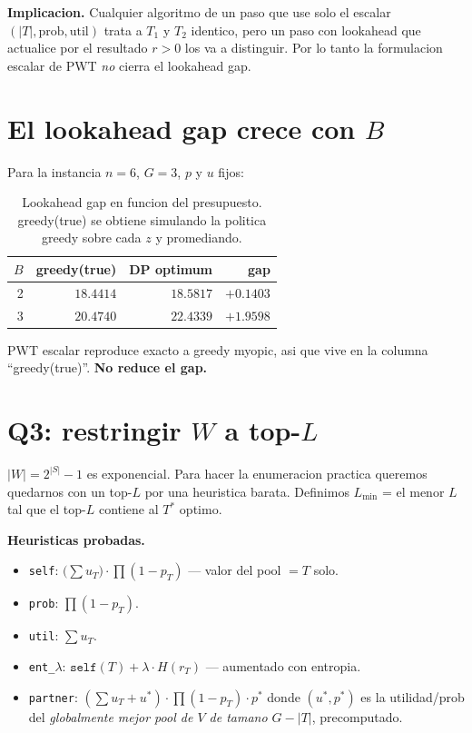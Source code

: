 \documentclass[11pt]{article}
\begin{document}
\textbf{Implicacion.} Cualquier algoritmo de un paso que use solo el
escalar $(|T|, \text{prob}, \text{util})$ trata a $T_1$ y $T_2$
identico, pero un paso con lookahead que actualice por el resultado
$r > 0$ los va a distinguir. Por lo tanto la formulacion escalar de
PWT \emph{no} cierra el lookahead gap.

\section{El lookahead gap crece con $B$}

Para la instancia $n=6$, $G=3$, $p$ y $u$ fijos:

\begin{table}[h]
\centering
\begin{tabular}{rrrr}
\toprule
$B$ & greedy(true) & DP optimum & gap \\
\midrule
2 & $18.4414$ & $18.5817$ & $+0.1403$ \\
3 & $20.4740$ & $22.4339$ & $+1.9598$ \\
\bottomrule
\end{tabular}
\caption{Lookahead gap en funcion del presupuesto. greedy(true) se
obtiene simulando la politica greedy sobre cada $z$ y promediando.}
\end{table}

PWT escalar reproduce exacto a greedy myopic, asi que vive en la
columna ``greedy(true)''. \textbf{No reduce el gap.}

\section{Q3: restringir $W$ a top-$L$}

$|W| = 2^{|S|} - 1$ es exponencial. Para hacer la enumeracion practica
queremos quedarnos con un top-$L$ por una heuristica barata. Definimos
$L_{\min}$ = el menor $L$ tal que el top-$L$ contiene al $T^*$ optimo.

\textbf{Heuristicas probadas.}
\begin{itemize}
\item \texttt{self}: $\big(\sum u_T\big) \cdot \prod(1 - p_T)$
  — valor del pool $= T$ solo.
\item \texttt{prob}: $\prod(1 - p_T)$.
\item \texttt{util}: $\sum u_T$.
\item \texttt{ent\_$\lambda$}: $\texttt{self}(T) + \lambda \cdot H(r_T)$
  — aumentado con entropia.
\item \texttt{partner}: $(\sum u_T + u^*) \cdot \prod(1 - p_T) \cdot p^*$
  donde $(u^*, p^*)$ es la utilidad/prob del \emph{globalmente mejor
  pool de $V$ de tamano $G - |T|$}, precomputado.
\end{itemize}
\end{document}
